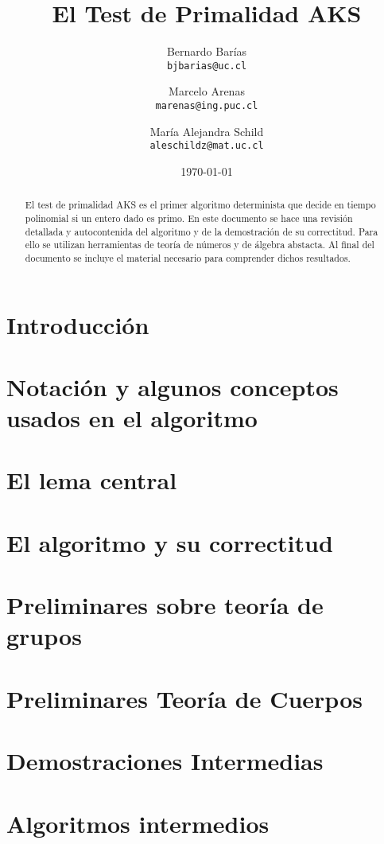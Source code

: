 \documentclass[10pt]{article}
\title{{\bf El Test de Primalidad AKS}}
\author{Bernardo Barías \\ 
\texttt{bjbarias@uc.cl}
\and 
Marcelo Arenas\\
\texttt{marenas@ing.puc.cl}
\and
María Alejandra Schild\\
\texttt{aleschildz@mat.uc.cl}}
\date{\today}
\newcommand{\0}{\mathbf{0}}
\newcommand{\1}{\mathbf{1}}
\newcommand{\+}{\oplus}
\theoremstyle{definition}
\theoremstyle{remark}
\theoremstyle{remark}
\begin{document}
	
	\maketitle
	
	
	\begin{abstract}
\noindent El test de primalidad AKS \cite{AKS04} es el primer algoritmo
determinista que decide en tiempo polinomial si un entero dado es
primo.
En este documento se hace una revisión detallada y autocontenida del algoritmo y de la demostración de su correctitud. Para ello se utilizan herramientas de teoría
de números y de álgebra abstacta. Al final del documento se incluye el material 
necesario para comprender dichos resultados.
\end{abstract}


\section{Introducción}


\section{Notación y algunos conceptos usados en el algoritmo}
\label{sec-notacion}


    
\section{El lema central}
\label{sec-lema-central}

	
\section{El algoritmo y su correctitud}
\label{sec-algoritmo-correctitud}





\appendix

\newpage


\section{Preliminares sobre teoría de grupos}
\label{app-grupos}



\section{Preliminares Teoría de Cuerpos}
\label{app-cuerpos}




\section{Demostraciones Intermedias}
\label{sec-demos-inter}



\section{Algoritmos intermedios}
\label{sec-app-alg-int}

\end{document}

